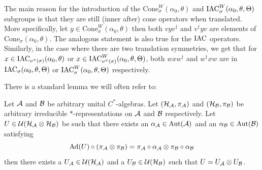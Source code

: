 \documentclass[11pt,a4paper,twoside]{article}
\numberwithin{equation}{section}
\begin{document}
	\begin{remark}
		The main reason for the introduction of the $\textrm{Cone}_\sigma^W(\alpha_0,\theta)$ and $\IAC^W_\sigma(\alpha_0,\theta,\Theta)$ subgroups is that they are still (inner after) cone operators when translated. More specifically, let $y\in\textrm{Cone}_\sigma^W(\alpha_0,\theta)$ then both $vyv^\dagger$ and $v^\dagger y v$ are elements of $\textrm{Cone}_\sigma(\alpha_0,\theta)$. The analogous statement is also true for the $\IAC$ operators. Similarly, in the case where there are two translation symmetries, we get that for $x\in\IAC_{\nu^\sigma(\sigma)}(\alpha_0,\theta)$ or $x\in\IAC_{\nu^\sigma(\sigma)}^W(\alpha_0,\theta,\Theta)$, both $wx w^\dagger$ and $w^\dagger x w$ are in $\IAC_{\sigma}(\alpha_0,\theta,\Theta)$ or $\IAC_{\sigma}^W(\alpha_0,\theta,\Theta)$ respectively.
	\end{remark}
	There is a standard lemma we will often refer to:
	\begin{lemma}\label{lem:SplittingOfUnitary}
		Let $\AA$ and $\BB$ be arbitrary unital $C^*$-algebras. Let $(\HH_\AA,\pi_\AA)$ and $(\HH_\BB,\pi_\BB)$ be arbitrary irreducible $*$-representations on $\AA$ and $\BB$ respectively. Let $U\in\UU(\HH_\AA\otimes\HH_\BB)$ be such that there exists an $\alpha_\AA\in\Aut{\AA}$ and an $\alpha_\BB\in\Aut{\BB}$ satisfying
		\begin{equation}
			\Ad{U}\circ(\pi_\AA\otimes\pi_\BB)=\pi_\AA\circ\alpha_\AA\otimes\pi_\BB\circ\alpha_\BB
		\end{equation}
		then there exists a $U_\AA\in\UU(\HH_\AA)$ and a $U_\BB\in\UU(\HH_\BB)$ such that $U=U_\AA\otimes U_\BB$.
	\end{lemma}
\end{document}
